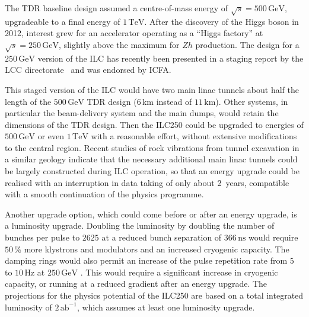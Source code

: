 \documentclass[%
 reprint,
 floatfix,
 amsmath,amssymb,
 aps,
]{revtex4-1}
\begin{document}
The TDR baseline design assumed
 a centre-of-mass energy of $\sqrt{s}=500\,{\mathrm{GeV}}$, upgradeable to a final energy of $1\,{\mathrm{TeV}}$.
After the discovery of the Higgs boson in 2012, interest 
grew for an accelerator operating as a ``Higgs factory'' at
 $\sqrt{s}=250\,{\mathrm{GeV}}$, slightly above the maximum for $Zh$ production. 
The design for a $250\,{\mathrm{GeV}}$ version of the 
ILC has recently been presented in a  staging
 report by the LCC directorate~\cite{Evans:2017rvt} and was endorsed by ICFA.

This staged version of the ILC  
would have two main linac tunnels about half the length of the
$500\,{\mathrm{GeV}}$ TDR design    ($6\,{\mathrm{km}}$  instead of $11\,{\mathrm{km}}$).
Other systems, in particular the beam-delivery system and the 
main dumps, would retain the dimensions of the TDR design.
Then the ILC250 could be upgraded to energies of $500\,{\mathrm{GeV}}$
or even $1\,{\mathrm{TeV}}$ with a reasonable effort, without
extensive
 modifications to the central region. 
Recent studies of rock vibrations from tunnel excavation in a similar
geology indicate that the necessary additional main linac tunnels
could be largely constructed during ILC operation, so that an energy
upgrade could be realised with an interruption in data taking of only
about 2~years, 
compatible with a smooth 
continuation of the physics programme.

Another upgrade option, which could come before or after an energy upgrade, is a luminosity upgrade. 
Doubling the luminosity by doubling the number of bunches per pulse to $2625$ at a reduced bunch separation of $366\,{\mathrm{ns}}$ would require $50\,\%$ more klystrons and modulators and an increased cryogenic capacity. 
The damping rings would also permit an increase of the pulse
 repetition rate from $5$ to $10\,{\mathrm{Hz}}$ at $250\,{\mathrm{GeV}}$ .  
This would require a significant increase in cryogenic capacity, 
or running at a reduced gradient after an energy upgrade.
The projections for the physics potential 
of the ILC250 are based on a total integrated 
luminosity of $2\,{\mathrm{ab}}^{-1}$, which assumes at least one luminosity upgrade.

\end{document}
